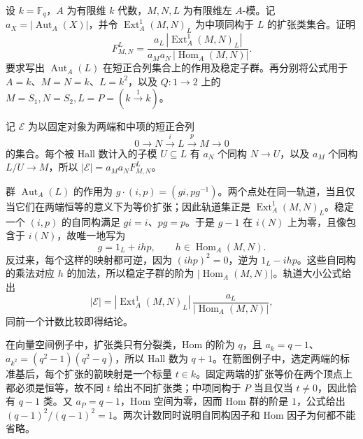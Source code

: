 \begin{exercise}\label{b5:ex:B:17}
	设 \(k=\mathbb F_q\)，\(A\) 为有限维 \(k\) 代数，\(M,N,L\) 为有限维左 \(A\)-模。记 \(a_X=|\operatorname{Aut}_A(X)|\)，并令 \(\operatorname{Ext}^1_A(M,N)_L\) 为中项同构于 \(L\) 的扩张类集合。证明
	\[
		F_{M,N}^{L}
		=\frac{a_L\,|\operatorname{Ext}^1_A(M,N)_L|}
		{a_Ma_N\,|\operatorname{Hom}_A(M,N)|}.
	\]
	要求写出 \(\operatorname{Aut}_A(L)\) 在短正合列集合上的作用及稳定子群。再分别将公式用于 \(A=k\)、\(M=N=k\)、\(L=k^2\)，以及 \(Q:1\to2\) 上的 \(M=S_1,N=S_2,L=P=(k\xrightarrow{1}k)\)。
\end{exercise}
\begin{solution}
	记 \(\mathcal E\) 为以固定对象为两端和中项的短正合列
	\[
		0\longrightarrow N\xrightarrow{i}L\xrightarrow{p}M\longrightarrow0
	\]
	的集合。每个被 Hall 数计入的子模 \(U\subseteq L\) 有 \(a_N\) 个同构 \(N\to U\)，以及 \(a_M\) 个同构 \(L/U\to M\)，所以 \(|\mathcal E|=a_Ma_NF_{M,N}^{L}\)。

	群 \(\operatorname{Aut}_A(L)\) 的作用为 \(g\cdot(i,p)=(gi,pg^{-1})\)。两个点处在同一轨道，当且仅当它们在两端恒等的意义下为等价扩张；因此轨道集正是 \(\operatorname{Ext}^1_A(M,N)_L\)。稳定一个 \((i,p)\) 的自同构满足 \(gi=i\)、\(pg=p\)。于是 \(g-1\) 在 \(i(N)\) 上为零，且像包含于 \(i(N)\)，故唯一地写为
	\[
		g=1_L+ihp,\qquad h\in\operatorname{Hom}_A(M,N).
	\]
	反过来，每个这样的映射都可逆，因为 \((ihp)^2=0\)，逆为 \(1_L-ihp\)。这些自同构的乘法对应 \(h\) 的加法，所以稳定子群的阶为 \(|\operatorname{Hom}_A(M,N)|\)。轨道大小公式给出
	\[
		|\mathcal E|
		=|\operatorname{Ext}^1_A(M,N)_L|\,
		\frac{a_L}{|\operatorname{Hom}_A(M,N)|},
	\]
	同前一个计数比较即得结论。

	在向量空间例子中，扩张类只有分裂类，Hom 的阶为 \(q\)，且 \(a_k=q-1\)、\(a_{k^2}=(q^2-1)(q^2-q)\)，所以 Hall 数为 \(q+1\)。在箭图例子中，选定两端的标准基后，每个扩张的箭映射是一个标量 \(t\in k\)。固定两端的扩张等价在两个顶点上都必须是恒等，故不同 \(t\) 给出不同扩张类；中项同构于 \(P\) 当且仅当 \(t\ne0\)，因此恰有 \(q-1\) 类。又 \(a_P=q-1\)，Hom 空间为零，因而 Hom 群的阶是 \(1\)，公式给出 \((q-1)^2/(q-1)^2=1\)。两次计数同时说明自同构因子和 Hom 因子为何都不能省略。
\end{solution}

